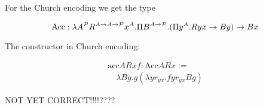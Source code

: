 For the Church encoding we get the type

$$
\text{Acc}:
    \lambda A^{\cal{P}} R^{A \to A \to {\cal{P}}} x^A.
        \Pi B^{A \to {\cal{P}}} .
            (\Pi y^A. R y x \to B y) \to B x
$$

The constructor  in Church encoding:

$$
\begin{array}{l}

    \text{acc} A R x f: \text{Acc} A R x :=
    \\
    \quad
    \lambda B g. g (\lambda y r_{yx}. f y r_{yx} B g)

\end{array}
$$

NOT YET CORRECT!!!!????



